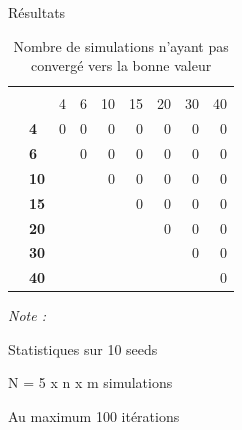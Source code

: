 \documentclass[10pt,xcolor=table,color={dvipsnames,usenames},ignorenonframetext,usepdftitle=false,french]{beamer}
\begin{document}
\begin{frame}{Résultats}
\protect\hypertarget{ruxe9sultats-7}{}

\begin{table}

\caption{\label{tab:tabq2nbnonconv}Nombre de simulations n'ayant pas convergé vers la bonne valeur}
\centering
\begin{threeparttable}
\begin{tabular}[t]{>{\bfseries}l|>{\bfseries}l|r|r|r|r|r|r|r}
\hline
\multicolumn{2}{c|}{ } & \multicolumn{7}{c}{m} \\
\cline{3-9}
  &    & 4 & 6 & 10 & 15 & 20 & 30 & 40\\
\hline
 & 4 & 0 & 0 & 0 & 0 & 0 & 0 & 0\\
\cline{2-9}
 & 6 &  & 0 & 0 & 0 & 0 & 0 & 0\\
\cline{2-9}
 & 10 &  &  & 0 & 0 & 0 & 0 & 0\\
\cline{2-9}
 & 15 &  &  &  & 0 & 0 & 0 & 0\\
\cline{2-9}
 & 20 &  &  &  &  & 0 & 0 & 0\\
\cline{2-9}
 & 30 &  &  &  &  &  & 0 & 0\\
\cline{2-9}
\multirow{-7}{*}{\raggedright\arraybackslash n} & 40 &  &  &  &  &  &  & 0\\
\hline
\end{tabular}
\begin{tablenotes}
\item \textit{Note : } 
\item Statistiques sur 10 seeds
\item N = 5 x n x m simulations
\item Au maximum 100 itérations
\end{tablenotes}
\end{threeparttable}
\end{table}

\end{frame}
\end{document}
